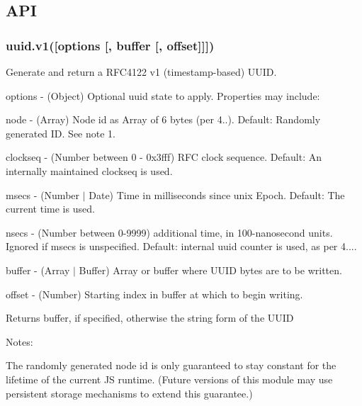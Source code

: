 \subsection*{A\+P\+I}

\subsubsection*{uuid.\+v1(\mbox{[}{\ttfamily options} \mbox{[}, {\ttfamily buffer} \mbox{[}, {\ttfamily offset}\mbox{]}\mbox{]}\mbox{]})}

Generate and return a R\+F\+C4122 v1 (timestamp-\/based) U\+U\+I\+D.


\begin{DoxyItemize}
\item {\ttfamily options} -\/ (Object) Optional uuid state to apply. Properties may include\+:
\begin{DoxyItemize}
\item {\ttfamily node} -\/ (Array) Node id as Array of 6 bytes (per 4..). Default\+: Randomly generated I\+D. See note 1.
\item {\ttfamily clockseq} -\/ (Number between 0 -\/ 0x3fff) R\+F\+C clock sequence. Default\+: An internally maintained clockseq is used.
\item {\ttfamily msecs} -\/ (Number $\vert$ Date) Time in milliseconds since unix Epoch. Default\+: The current time is used.
\item {\ttfamily nsecs} -\/ (Number between 0-\/9999) additional time, in 100-\/nanosecond units. Ignored if {\ttfamily msecs} is unspecified. Default\+: internal uuid counter is used, as per 4....
\end{DoxyItemize}
\item {\ttfamily buffer} -\/ (Array $\vert$ Buffer) Array or buffer where U\+U\+I\+D bytes are to be written.
\item {\ttfamily offset} -\/ (Number) Starting index in {\ttfamily buffer} at which to begin writing.
\end{DoxyItemize}

Returns {\ttfamily buffer}, if specified, otherwise the string form of the U\+U\+I\+D

Notes\+:


\begin{DoxyEnumerate}
\item The randomly generated node id is only guaranteed to stay constant for the lifetime of the current J\+S runtime. (Future versions of this module may use persistent storage mechanisms to extend this guarantee.)
\end{DoxyEnumerate}

